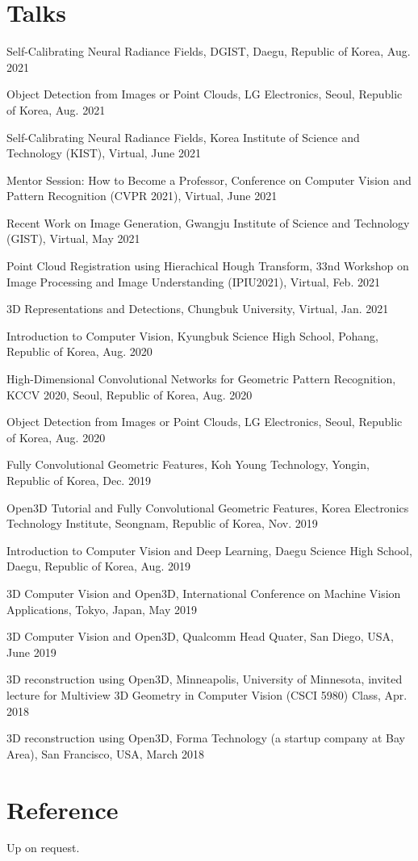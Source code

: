 \documentclass[letterpaper,11pt]{article}
\newcommand{\resumeItem}[1]{
  \small{
  \item{#1 \vspace{-2pt}}
  }
}
\newcommand{\resumeItemListStart}{\begin{itemize}}
\newcommand{\resumeItemListEnd}{\end{itemize}\vspace{-5pt}}
\begin{document}
\section{Talks}
\resumeItemListStart
    \resumeItem{Self-Calibrating Neural Radiance Fields, DGIST, Daegu, Republic of Korea, Aug. 2021}
    \resumeItem{Object Detection from Images or Point Clouds, LG Electronics, Seoul, Republic of Korea, Aug. 2021}
    \resumeItem{Self-Calibrating Neural Radiance Fields, Korea Institute of Science and Technology (KIST), Virtual, June 2021}
    \resumeItem{Mentor Session: How to Become a Professor, Conference on Computer Vision and Pattern Recognition (CVPR 2021), Virtual, June 2021}
    \resumeItem{Recent Work on Image Generation, Gwangju Institute of Science and Technology (GIST), Virtual, May 2021}
    \resumeItem{Point Cloud Registration using Hierachical Hough Transform, 33nd Workshop on Image Processing and Image Understanding (IPIU2021), Virtual, Feb. 2021}
    \resumeItem{3D Representations and Detections, Chungbuk University, Virtual, Jan. 2021}
    \resumeItem{Introduction to Computer Vision, Kyungbuk Science High School, Pohang, Republic of Korea, Aug. 2020}
    \resumeItem{High-Dimensional Convolutional Networks for Geometric Pattern Recognition, KCCV 2020, Seoul, Republic of Korea, Aug. 2020}
    \resumeItem{Object Detection from Images or Point Clouds, LG Electronics, Seoul, Republic of Korea, Aug. 2020}
    \resumeItem{Fully Convolutional Geometric Features, Koh Young Technology, Yongin, Republic of Korea, Dec. 2019}
    \resumeItem{Open3D Tutorial and Fully Convolutional Geometric Features, Korea Electronics Technology Institute, Seongnam, Republic of Korea, Nov. 2019}
    \resumeItem{Introduction to Computer Vision and Deep Learning, Daegu Science High School, Daegu, Republic of Korea, Aug. 2019}
    \resumeItem{3D Computer Vision and Open3D, International Conference on Machine Vision Applications, Tokyo, Japan, May 2019}
    \resumeItem{3D Computer Vision and Open3D, Qualcomm Head Quater, San Diego, USA, June 2019}
    \resumeItem{3D reconstruction using Open3D, Minneapolis, University of Minnesota, invited lecture for Multiview 3D Geometry in Computer Vision (CSCI 5980) Class, Apr. 2018}
    \resumeItem{3D reconstruction using Open3D, Forma Technology (a startup company at Bay Area), San Francisco, USA, March 2018}
\resumeItemListEnd





\section{Reference}
\resumeItemListStart
\resumeItem{Up on request.}
\resumeItemListEnd
\end{document}
